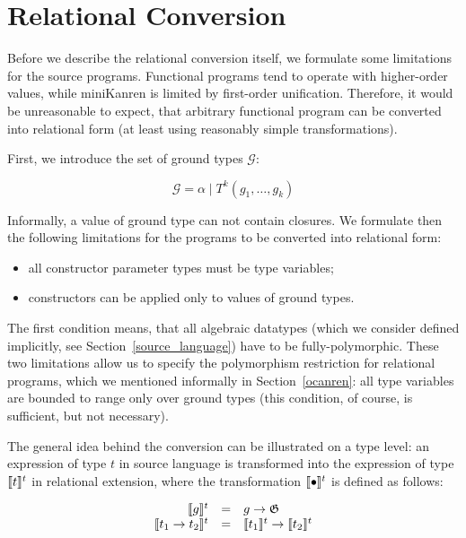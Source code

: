 \section{Relational Conversion}
\label{conversion}
\def\arraystretch{1}

Before we describe the relational conversion itself, we formulate some limitations for the source
programs. Functional programs tend to operate with higher-order values, while miniKanren is
limited by first-order unification. Therefore, it would be unreasonable to expect, that arbitrary
functional program can be converted into relational form (at least using reasonably simple 
transformations). 

First, we introduce the set of ground types $\mathcal G$:

$$
\mathcal G=\alpha \mid T^k(g_1,\dots,g_k)
$$

Informally, a value of ground type can not contain closures. We formulate then the following limitations for
the programs to be converted into relational form:

\begin{itemize}
  \item all constructor parameter types must be type variables;
  \item constructors can be applied only to values of ground types.
\end{itemize}

The first condition means, that all algebraic datatypes (which we consider defined implicitly, see Section~\ref{source_language}) 
have to be fully-polymorphic. These two limitations allow us to specify the polymorphism restriction for 
relational programs, which we mentioned informally in Section~\ref{ocanren}: all type variables are bounded to
range only over ground types (this condition, of course, is sufficient, but not necessary).

The general idea behind the conversion can be illustrated on a type level: an expression of type $t$ in source
language is transformed into the expression of type $\llbracket{t}\rrbracket^t$ in relational extension, where
the transformation $\llbracket{\bullet}\rrbracket^t$ is defined as follows:

$$
\begin{array}{rcl}
\llbracket{g}\rrbracket^t                     & = & g \to \mathfrak G \\
\llbracket{t_1 \to t_2}\rrbracket^t           & = & \llbracket{t_1}\rrbracket^t \to \llbracket{t_2}\rrbracket^t \\
\end{array}
$$

